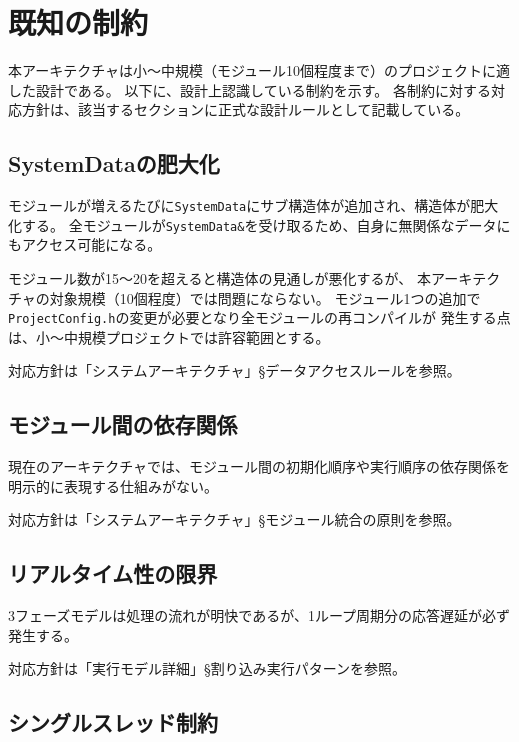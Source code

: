 \section{既知の制約}

本アーキテクチャは小〜中規模（モジュール10個程度まで）のプロジェクトに適した設計である。
以下に、設計上認識している制約を示す。
各制約に対する対応方針は、該当するセクションに正式な設計ルールとして記載している。

\subsection{SystemDataの肥大化}

モジュールが増えるたびに\texttt{SystemData}にサブ構造体が追加され、構造体が肥大化する。
全モジュールが\texttt{SystemData\&}を受け取るため、自身に無関係なデータにもアクセス可能になる。

\begin{notebox}[肥大化の許容範囲]
モジュール数が15〜20を超えると構造体の見通しが悪化するが、
本アーキテクチャの対象規模（10個程度）では問題にならない。
モジュール1つの追加で\texttt{ProjectConfig.h}の変更が必要となり全モジュールの再コンパイルが
発生する点は、小〜中規模プロジェクトでは許容範囲とする。

対応方針は「システムアーキテクチャ」§データアクセスルールを参照。
\end{notebox}

\subsection{モジュール間の依存関係}

現在のアーキテクチャでは、モジュール間の初期化順序や実行順序の依存関係を
明示的に表現する仕組みがない。

対応方針は「システムアーキテクチャ」§モジュール統合の原則を参照。

\subsection{リアルタイム性の限界}

3フェーズモデルは処理の流れが明快であるが、1ループ周期分の応答遅延が必ず発生する。

対応方針は「実行モデル詳細」§割り込み実行パターンを参照。

\subsection{シングルスレッド制約}

